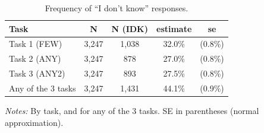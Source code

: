 \begin{table}[H]
    \centering
    \caption{Frequency of ``I don't know'' responses.}
    \begin{tabular}{ l c c c c }
\hline \hline
Task & N & N (IDK) & estimate & se \\
\hline
\hspace{0.05cm} Task 1 (FEW) & 3,247 & 1,038 & 32.0\% & (0.8\%) \\
\hspace{0.05cm} Task 2 (ANY) & 3,247 &   878 & 27.0\% & (0.8\%) \\
\hspace{0.05cm} Task 3 (ANY2) & 3,247 &   893 & 27.5\% & (0.8\%) \\
\hspace{0.05cm} Any of the 3 tasks & 3,247 & 1,431 & 44.1\% & (0.9\%) \\
\hline \hline
\end{tabular}
\begin{tablenotes}
\small
\item \textit{Notes:} By task, and for any of the 3 tasks. SE in parentheses (normal approximation).
\end{tablenotes}
    \label{tab:table11}
\end{table}
